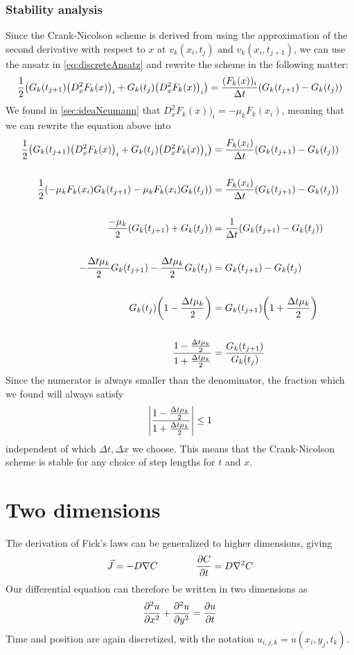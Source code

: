 \documentclass[12pt,english,a4paper]{article}
\begin{document}
\subsubsection{Stability analysis}
Since the Crank-Nicolson scheme is derived from using the approximation of the second derivative with respect to \(x\) at \(v_k(x_i,t_j)\) and \(v_k(x_i,t_{j+1})\), we can use the ansatz in \vref{eq:discreteAnsatz} and rewrite the scheme in the following matter:
\[
\frac{1}{2}\qty(G_k(t_{j+1})\qty(D_x^2F_k(x) )_i +  G_k(t_j)\qty(D_x^2F_k(x))_i ) = \frac{(F_k(x) )_i }{\Delta t}\qty(G_k(t_{j+1}) - G_k(t_j) )
\]
We found in \vref{sec:ideaNeumann} that \(D_x^2F_k(x))_i = -\mu_kF_k(x_i)\), meaning that we can rewrite the equation above into 
\begin{align*}
\frac{1}{2}\qty(G_k(t_{j+1})\qty(D_x^2F_k(x) )_i +  G_k(t_j)\qty(D_x^2F_k(x))_i ) &= \frac{F_k(x_i) }{\Delta t}\qty(G_k(t_{j+1}) - G_k(t_j) ) \\ \hfill \\
\frac{1}{2}\qty(-\mu_kF_k(x_i)G_k(t_{j+1}) -\mu_kF_k(x_i)G_k(t_j))&= \frac{F_k(x_i)}{\Delta t}\qty(G_k(t_{j+1}) - G_k(t_j) )  \\\hfill \\
\frac{-\mu_k}{2}\qty(G_k(t_{j+1}) +G_k(t_j))&= \frac{1}{\Delta t}\qty(G_k(t_{j+1}) - G_k(t_j) )  \\\hfill \\
-\frac{\Delta t\mu_k}{2}G_k(t_{j+1}) -\frac{\Delta t\mu_k}{2} G_k(t_j)&= G_k(t_{j+1}) - G_k(t_j)   \\\hfill \\
G_k(t_j)\qty(1-\frac{\Delta t\mu_k}{2})&= G_k(t_{j+1})\qty(1+\frac{\Delta t\mu_k}{2} )    \\\hfill \\
\frac{1-\frac{\Delta t\mu_k}{2}}{1+\frac{\Delta t\mu_k}{2}}&= \frac{G_k(t_{j+1}) }{G_k(t_j)}   
\end{align*}
Since the numerator is always smaller than the denominator, the fraction which we found will always satisfy
\[
\abs{\frac{1-\frac{\Delta t\mu_k}{2}}{1+\frac{\Delta t\mu_k}{2}}} \leq 1
\]
independent of which \( \Delta t, \Delta x\) we choose. This means that the Crank-Nicolson scheme is stable for any choice of step lengths for \(t\) and \(x\). 
\section{Two dimensions}
The derivation of Fick's laws can be generalized to higher dimensions, giving
\[
    \vec{J} = -D\nabla C \qquad\qquad \pdv{C}{t} = D\nabla^2C
\]
Our differential equation can therefore be written in two dimensions as
\[
     \pdv[2]{u}{x} + \pdv[2]{u}{y} = \pdv{u}{t}
\]
Time and position are again discretized, with the notation \(u_{i,j,k} = u(x_i,y_j,t_k)\).
\end{document}
